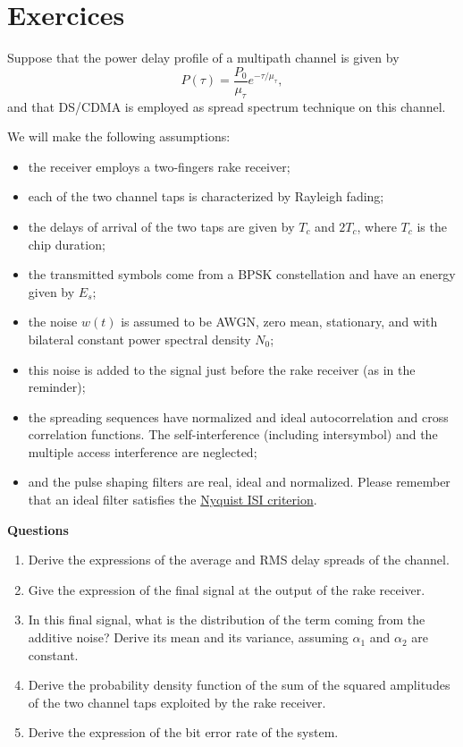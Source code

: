 \documentclass [a4paper, 11pt] {article}
\begin{document}
    \part*{Exercices}
    
    \begin{exercise}{1}

Suppose that the power delay profile of a multipath channel is given by 
\begin{equation}
    P(\tau) = \frac{P_0}{\mu_\tau}e^{-\tau/\mu_\tau},
\end{equation}
and that DS/CDMA is employed as spread spectrum technique on this channel. 

We will make the following assumptions: 

\begin{itemize}
    \item the receiver employs a two-fingers rake receiver;
    \item each of the two channel taps is characterized by Rayleigh fading;
    \item the delays of arrival of the two taps are given by $T_c$ and $2T_c$, where $T_c$ is the chip duration;
    \item the transmitted symbols come from a BPSK constellation and have an energy given by $E_s$;
    \item the noise $w(t)$ is assumed to be AWGN, zero mean, stationary, and with bilateral constant power spectral density $N_0$;
    \item this noise is added to the signal just before the rake receiver (as in the reminder);
    \item the spreading sequences have normalized and ideal autocorrelation and cross correlation functions. The self-interference (including intersymbol) and the multiple access interference are neglected;
    \item and the pulse shaping filters are real, ideal and normalized. Please remember that an ideal filter satisfies the \href{https://en.wikipedia.org/wiki/Nyquist_ISI_criterion}{Nyquist ISI criterion}.
\end{itemize} 


{\normalfont \textbf{Questions}}

\begin{enumerate}
    \item Derive the expressions of the average and RMS delay spreads of the channel. 
    \item Give the expression of the final signal at the output of the rake receiver. 
    \item In this final signal, what is the distribution of the term coming from the additive noise? Derive its mean and its variance, assuming $\alpha_1$ and $\alpha_2$ are constant. 
    \item Derive the probability density function of the sum of the squared amplitudes of the two channel taps exploited by the rake receiver.
    \item Derive the expression of the bit error rate of the system. 
\end{enumerate}


\end{exercise}
\end{document}
